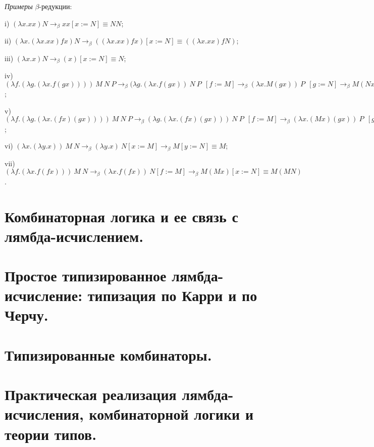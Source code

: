 \documentclass[a4paper]{article}
\begin{document}
\emph{Примеры} $\beta$-редукции:

i) $(\lambda x. x x)N \rightarrow_{\beta} x x [x := N] \equiv N N$;

ii) $(\lambda x. (\lambda x. x x) f x)N \rightarrow_{\beta} ((\lambda x. x x) f x) [x := N] \equiv ((\lambda x. xx) f N)$;

iii) $(\lambda x.x) N \rightarrow_{\beta} (x) [x := N] \equiv N$;

iv) $(\lambda f. (\lambda g. (\lambda x. f (g x)))) \: M \: N \: P \rightarrow_{\beta} (\lambda g. (\lambda x. f (g x)) \: N \: P \:\: [f := M] \rightarrow_{\beta} (\lambda x. M (g x)) \: P \:\: [g := N] \rightarrow_{\beta} M (N x) [x := P] \equiv M (N P)$;

v) $(\lambda f. (\lambda g. (\lambda x . (f x) (g x)))) \: M \: N \: P \rightarrow_{\beta} (\lambda g. (\lambda x. (f x) (g x))) \: N \: P \:\: [f := M] \rightarrow_{\beta} (\lambda x. (M x) (g x)) \: P \:\: [g := N] \rightarrow_{\beta} (M x) (N x) [x := P] \equiv (M P) (N P)$;

vi) $(\lambda x. (\lambda y. x)) \: M \: N \rightarrow_{\beta} (\lambda y. x) \: N [x := M] \rightarrow_{\beta} M [y := N] \equiv M$;

vii) $(\lambda f. (\lambda x. f(f x))) \: M \: N \rightarrow_{\beta} (\lambda x. f(f x)) \: N [f := M] \rightarrow_{\beta} M (M x) [x := N] \equiv M (M N)$.



\section{Комбинаторная логика и ее связь с лямбда-исчислением.}
\section{Простое типизированное лямбда-исчисление: типизация по Карри и по Черчу.}
\section{Типизированные комбинаторы.}
\section{Практическая реализация лямбда-исчисления, комбинаторной логики и теории типов.}
\end{document}
